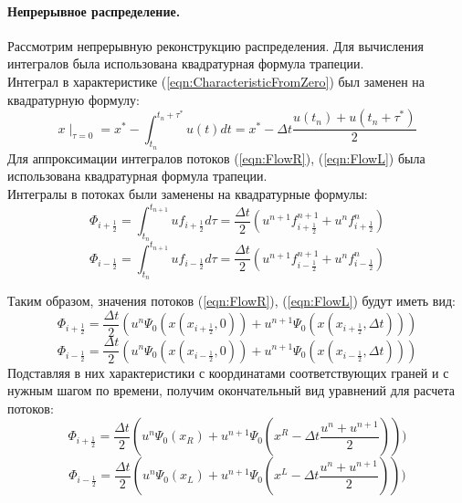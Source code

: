 \documentclass[10pt,a4paper]{article}
\begin{document}
\paragraph{Непрерывное распределение.}
Рассмотрим непрерывную реконструкцию распределения. Для вычисления интегралов была использована квадратурная формула трапеции.\\
Интеграл в характеристике (\ref{eqn:CharacteristicFromZero}) был заменен на квадратурную формулу:
\begin{equation}
\label{eqn:CharacteristicQuadr}
x\mid_{\tau=0}=x^*-\int_{t_n}^{t_n+\tau^*}u(t)dt=x^*-\Delta t \frac{u(t_n)+u(t_n+\tau^*)}{2}
\end{equation}
Для аппроксимации интегралов потоков (\ref{eqn:FlowR}), (\ref{eqn:FlowL}) была использована квадратурная формула трапеции.\\
Интегралы в потоках были заменены на квадратурные формулы:
\begin{equation}
\label{eqn:flowRQuadr}
\Phi_{i+\frac{1}{2}}=\int_{t_n}^{t_{n+1}}
{u}f_{i+\frac{1}{2}}d\tau= \frac{\Delta t}{2}(
u^{n+1}f_{i+\frac{1}{2}}^{n+1} +
u^{n}f_{i+\frac{1}{2}}^{n}
)
\end{equation}
\begin{equation}
\label{eqn:flowLQuadr}
\Phi_{i-\frac{1}{2}}=\int_{t_n}^{t_{n+1}}
{u}f_{i-\frac{1}{2}}d\tau= \frac{\Delta t}{2}(
u^{n+1}f_{i-\frac{1}{2}}^{n+1} +
u^{n}f_{i-\frac{1}{2}}^{n}
)
\end{equation}

Таким образом, значения потоков (\ref{eqn:FlowR}), (\ref{eqn:FlowL}) будут иметь вид:
\begin{equation}
\label{eqn:FlowRContPsi}
\Phi_{i+\frac{1}{2}}= \frac{\Delta t}{2}(
u^{n} \Psi_{0}(x(x_{i+\frac{1}{2}}, 0))
+
u^{n+1} \Psi_{0}(x(x_{i+\frac{1}{2}}, \Delta t))
)
\end{equation}
\begin{equation}
\label{eqn:FlowLContPsi}
\Phi_{i-\frac{1}{2}}= \frac{\Delta t}{2}(
u^n \Psi_{0}(x(x_{i-\frac{1}{2}}, 0))
+
u^{n+1} \Psi_{0}(x(x_{i-\frac{1}{2}}, \Delta t))
)
\end{equation}
Подставляя в них характеристики с координатами соответствующих граней и с нужным шагом по времени, получим окончательный вид уравнений для расчета потоков:
\begin{equation}
\label{eqn:FlowRContPsi}
\Phi_{i+\frac{1}{2}}= \frac{\Delta t}{2}(
u^{n} \Psi_{0}(x_R)
+
u^{n+1} \Psi_{0}(x^R-\Delta t \frac{u^n+u^{n+1}}{2}))
)
\end{equation}
\begin{equation}
\label{eqn:FlowLContPsi}
\Phi_{i-\frac{1}{2}}= \frac{\Delta t}{2}(
u^{n} \Psi_{0}(x_L)
+
u^{n+1} \Psi_{0}(x^L-\Delta t \frac{u^n+u^{n+1}}{2}))
)
\end{equation}
\end{document}
